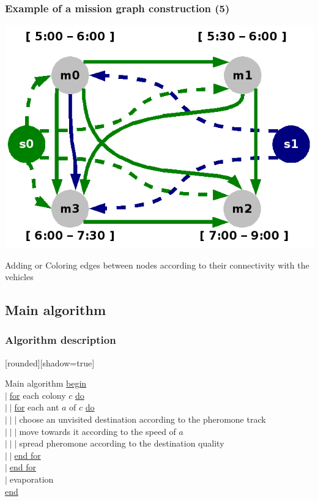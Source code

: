 \documentclass{beamer}
\begin{document}
\begin{frame}
	\frametitle{Example of a mission graph construction (5)}
 	\begin{center}
 		\includegraphics[height=.50\textheight]{fig/missionGraphComplet.png}
		
		Adding or Coloring edges between nodes according to their connectivity with the vehicles
	\end{center}
\end{frame}
\subsection*{Main algorithm}

\begin{frame}
\frametitle{Algorithm description}
	[rounded][shadow=true]
	\begin{block}{Main algorithm}
	\underline{begin}\\
	$\vert \;$\underline{for} each colony $c$ \underline{do}\\
	$\vert \;\vert \;$\underline{for} each ant $a$ of $c$ \underline{do}\\
	$\vert \;\vert \;\vert \;$choose an unvisited destination according to the pheromone track\\
	$\vert \;\vert \;\vert \;$move towards it according to the speed of $a$\\
	$\vert \;\vert \;\vert \;$spread pheromone according to the destination quality\\
	$\vert \;\vert \;$\underline{end for}\\
	$\vert \;$\underline{end for}\\
	$\vert \;$evaporation\\
	\underline{end}\\
	\end{block}
\end{frame}
\end{document}
